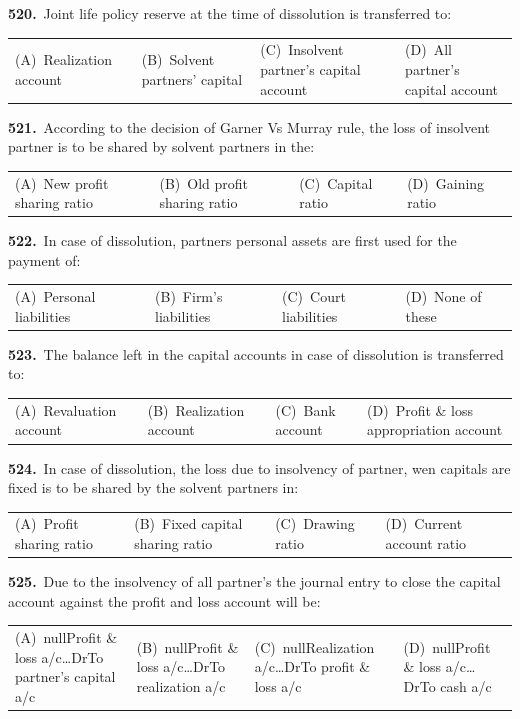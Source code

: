 \documentclass[11pt,a4paper]{article}
\makeatletter
\newcommand{\mcq}[6]{%
  \Needspace{4\baselineskip}%
  \par\medskip\noindent\textbf{#1.}\ #2\par\nopagebreak
  \noindent\begin{tabularx}{\linewidth}{@{\hspace{1.5em}}*{4}{>{\raggedright\arraybackslash}X}@{}}
    (A)~#3 & (B)~#4 & (C)~#5 & (D)~#6
  \end{tabularx}\par}
\makeatother
\begin{document}
\mcq{520}{Joint life policy reserve at the time of dissolution is transferred to:}{Realization account}{Solvent partners’ capital}{Insolvent partner’s capital account}{All partner’s capital account}
\mcq{521}{According to the decision of Garner Vs Murray rule, the loss of insolvent partner is to be shared by solvent partners in the:}{New profit sharing ratio}{Old profit sharing ratio}{Capital ratio}{Gaining ratio}
\mcq{522}{In case of dissolution, partners personal assets are first used for the payment of:}{Personal liabilities}{Firm’s liabilities}{Court liabilities}{None of these}
\mcq{523}{The balance left in the capital accounts in case of dissolution is transferred to:}{Revaluation account}{Realization account}{Bank account}{Profit \& loss appropriation account}
\mcq{524}{In case of dissolution, the loss due to insolvency of partner, wen capitals are fixed is to be shared by the solvent partners in:}{Profit sharing ratio}{Fixed capital sharing ratio}{Drawing ratio}{Current account ratio}
\mcq{525}{Due to the insolvency of all partner’s the journal entry to close the capital account against the profit and loss account will be:}{nullProfit \& loss a/c…DrTo partner’s capital a/c}{nullProfit \& loss a/c…DrTo realization a/c}{nullRealization a/c…DrTo profit \& loss a/c}{nullProfit \& loss a/c…DrTo cash a/c}
\end{document}
